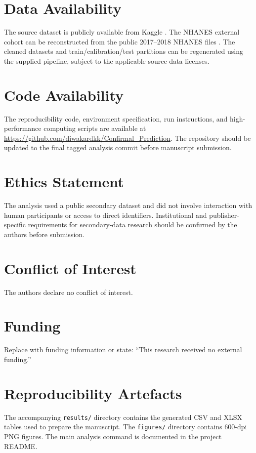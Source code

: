 \documentclass{ieeeaccess}
\begin{document}
\section*{Data Availability}
The source dataset is publicly available from Kaggle \cite{mustafa2023dataset}. The NHANES external cohort can be reconstructed from the public 2017--2018 NHANES files \cite{nhanes2018overview,nhanes2018glu}. The cleaned datasets and train/calibration/test partitions can be regenerated using the supplied pipeline, subject to the applicable source-data licenses.

\section*{Code Availability}
The reproducibility code, environment specification, run instructions, and high-performance computing scripts are available at \url{https://github.com/diwakardkk/Confirmal_Prediction}. The repository should be updated to the final tagged analysis commit before manuscript submission.

\section*{Ethics Statement}
The analysis used a public secondary dataset and did not involve interaction with human participants or access to direct identifiers. Institutional and publisher-specific requirements for secondary-data research should be confirmed by the authors before submission.

\section*{Conflict of Interest}
The authors declare no conflict of interest.

\section*{Funding}
Replace with funding information or state: ``This research received no external funding.''

\appendices
\section{Reproducibility Artefacts}
The accompanying \texttt{results/} directory contains the generated CSV and XLSX tables used to prepare the manuscript. The \texttt{figures/} directory contains 600-dpi PNG figures. The main analysis command is documented in the project README.



\end{document}
